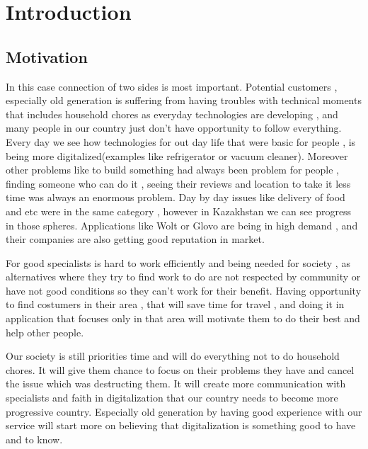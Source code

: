 \chapter{Introduction}\label{ch:intro}
\section{Motivation}
\hspace{7mm}In this case connection of two sides is most important. Potential customers , especially old generation is suffering from having troubles with technical moments that includes household chores as everyday technologies are developing , and many people in our country just don’t have opportunity to follow everything. Every day we see how technologies for out day life that were basic for people , is being more digitalized(examples like refrigerator or vacuum cleaner). Moreover other problems like to build something had always been problem for people , finding someone who can do it , seeing their reviews and location to take it less time was always an enormous problem. Day by day issues like delivery of food and etc were in the same category , however in Kazakhstan we can see progress in those spheres. Applications like Wolt or Glovo are being in high demand , and their companies are also getting good reputation in market.


For good specialists is hard to work efficiently and being needed for society , as alternatives where they try to find work to do are not respected by community or have not good conditions so they can’t work for their benefit. Having opportunity to find costumers in their area , that will save time for travel , and doing it in application that focuses only in that area will motivate them to do their best and help other people.


Our society is still priorities time and will do everything not to do household chores. It will give them chance to focus on their problems they have and cancel the issue which was destructing them. It will create more communication with specialists and faith in digitalization that our country needs to become more progressive country. Especially old generation by having good experience with our service will start more on believing that digitalization is something good to have and to know.
